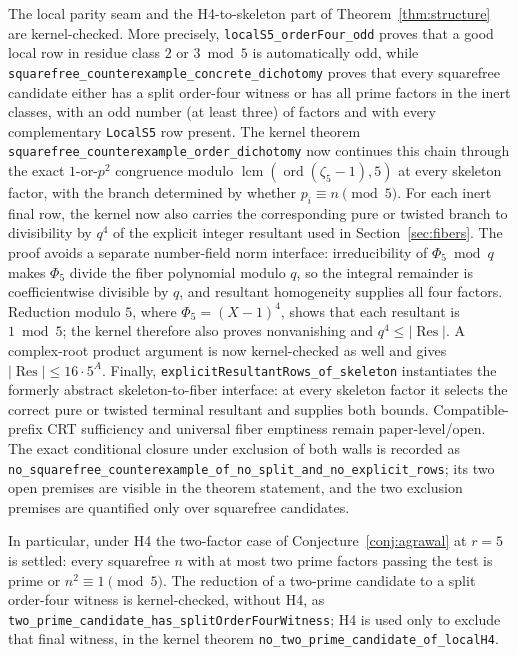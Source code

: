 \documentclass[11pt]{amsart}
\theoremstyle{definition}
\theoremstyle{remark}
\begin{document}
The local parity seam and the H4-to-skeleton part of
Theorem~\ref{thm:structure} are kernel-checked.  More precisely,
\texttt{localS5\_orderFour\_odd} proves that a good local row in residue
class $2$ or $3\bmod 5$ is automatically odd, while
\texttt{squarefree\_counterexample\_concrete\_dichotomy} proves that every
squarefree candidate either has a split order-four witness or has all
prime factors in the inert classes, with an odd number (at least three) of
factors and with every complementary \texttt{LocalS5} row present.
The kernel theorem
\texttt{squarefree\_counterexample\_order\_dichotomy} now continues this
chain through the exact $1$-or-$p^2$ congruence modulo
$\operatorname{lcm}(\operatorname{ord}(\zeta_5-1),5)$ at every skeleton
factor, with the branch determined by whether $p_i\equiv n\pmod5$.
For each inert final row, the kernel now also carries the corresponding
pure or twisted branch to divisibility by \(q^4\) of the explicit integer
resultant used in Section~\ref{sec:fibers}.  The proof avoids a separate
number-field norm interface: irreducibility of \(\Phi_5\bmod q\) makes
\(\Phi_5\) divide the fiber polynomial modulo \(q\), so the integral
remainder is coefficientwise divisible by \(q\), and resultant homogeneity
supplies all four factors.  Reduction modulo \(5\), where
\(\Phi_5=(X-1)^4\), shows that each resultant is \(1\bmod5\); the kernel
therefore also proves nonvanishing and
\(q^4\le|\operatorname{Res}|\).  A complex-root product argument is now
kernel-checked as well and gives
\(|\operatorname{Res}|\le16\cdot5^A\).  Finally,
\texttt{explicitResultantRows\_of\_skeleton} instantiates the formerly
abstract skeleton-to-fiber interface: at every skeleton factor it selects
the correct pure or twisted terminal resultant and supplies both bounds.
Compatible-prefix CRT sufficiency and universal fiber emptiness remain
paper-level/open.  The exact conditional closure under exclusion of both
walls is recorded as
\texttt{no\_squarefree\_counterexample\_of\_no\_split\_and\_no\_explicit\_rows};
its two open premises are visible in the theorem statement, and the
two exclusion premises are quantified only over squarefree candidates.

In particular, under H4 the two-factor case of
Conjecture~\ref{conj:agrawal} at $r = 5$ is settled: every squarefree $n$
with at most two prime factors passing the test is prime or
$n^2 \equiv 1 \pmod 5$.  The reduction of a two-prime candidate to a split
order-four witness is kernel-checked, without H4, as
\texttt{two\_prime\_candidate\_has\_splitOrderFourWitness}; H4 is used only
to exclude that final witness, in the kernel theorem
\texttt{no\_two\_prime\_candidate\_of\_localH4}.
\end{document}
